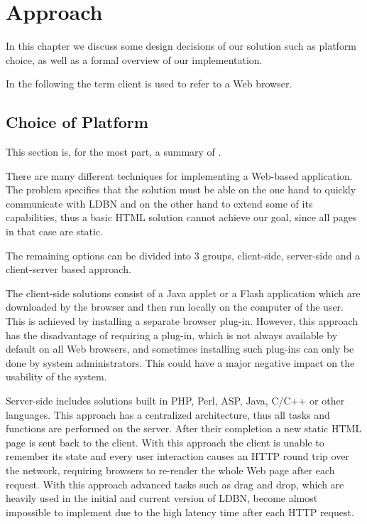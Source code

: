 \chapter{Approach}
\label{chap:approach}
In this chapter we discuss some design decisions of our solution such as 
platform choice, as well as a formal overview of our implementation. 

In the following the term client is used to refer to a Web browser.

\section{Choice of Platform}
\label{sec:platform}
This section is, for the most part, a summary of \cite[Section~3.1 and Section~3.2]{mt1}.

There are many different techniques for implementing a Web-based application. 
The problem specifies that the solution must be able on the one hand to 
quickly communicate with LDBN 
and on the other hand to extend some of its capabilities, 
thus a basic HTML solution cannot achieve our goal, 
since all pages in that case are static. 

The remaining options can be divided into 3 groups, client-side, server-side and
a client-server based approach. %

The client-side solutions consist of a Java applet or a Flash application 
which are downloaded by the browser and then run locally on the computer of the user.
This is achieved by installing a separate browser plug-in. However, this approach has the disadvantage
of requiring a plug-in, which is not always available by default on all Web browsers, and sometimes
installing such plug-ins can only be done by system administrators. This could have a major negative
impact on the usability of the system. 

Server-side includes solutions built in PHP, Perl, ASP, Java, C/C++ or other languages.
This approach
has a centralized architecture, thus all tasks and functions are performed on the server.
After their completion a new static HTML page is sent back to the client.
With this approach the client is unable to remember its state and 
every user interaction causes an HTTP round trip over the network, 
requiring browsers to re-render the whole Web page after each request. With this approach
advanced tasks such as drag and drop, which are heavily used in the initial and current
version of LDBN, become almost impossible to implement due to the high latency time after each
HTTP request. 

